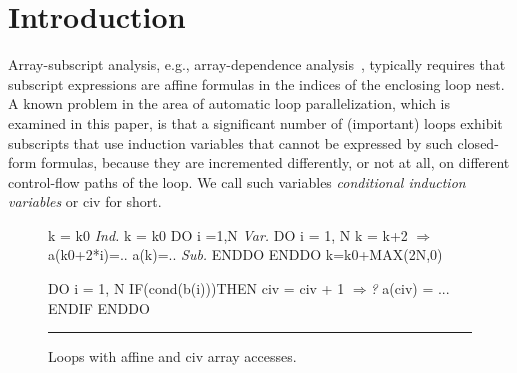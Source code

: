 \documentclass{sig-alternate}
\newcommand{\emp}[1]{\textcolor{DikuRed}{ #1}}
\newcommand{\emphh}[1]{\textcolor{CosGreen}{ #1}}
\newcommand{\mymath}[1]{$ #1 $}
\begin{document}





\section{Introduction}


\enlargethispage{\baselineskip}

Array-subscript analysis, e.g., array-dependence analysis~\cite{BanerjeeIneqTest,FeautrierDataflow,Pugh92theomega},
typically requires that subscript expressions are affine formulas
in the indices of the enclosing loop nest.   A known problem in 
the area of automatic loop parallelization, which is examined in this paper, 
is that a significant number of (important) loops exhibit subscripts 
that use induction variables that cannot be expressed by such closed-form 
formulas, because they are incremented differently, or not at all, on 
different control-flow paths of the loop.   We call such variables
{\em conditional induction variables} or {\sc civ} for short.


\begin{figure}
\begin{minipage}{0.58\columnwidth}
\begin{colorcode}
k = k0     \emphh{\em Ind.}  k = k0        
DO i =1,N  \emphh{\em Var.}  DO i = 1, N      
  k = k+2    \emphh{\mymath{\Rightarrow}}    a(k0+2*i)=.. 
  a(k)=..  \emphh{\em Sub.}  ENDDO         
ENDDO            k=k0+MAX(2N,0)
\end{colorcode}
\end{minipage}
\begin{minipage}{0.35\columnwidth}
\begin{colorcode}
DO i = 1, N
 IF(cond(b(i)))THEN 
    civ = civ + 1 \emp{\mymath{\Rightarrow}{\em ?}} 
    a(civ) = ...
ENDIF ENDDO
\end{colorcode}
\end{minipage}
\hrule
\caption{Loops with affine and {\sc civ} array accesses.}
\label{fig:introEg}
\vspace{-2ex}
\end{figure}
\end{document}
